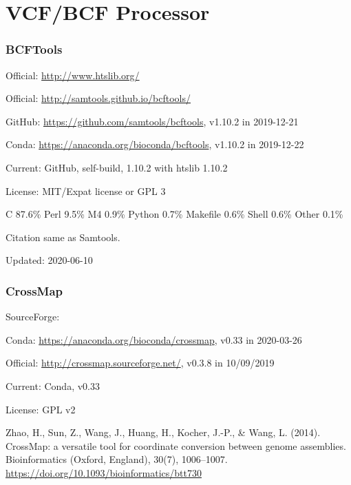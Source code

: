 \documentclass[]{article}
\begin{document}
\part{VCF/BCF Processor}

\section{BCFTools}

Official: \url{http://www.htslib.org/}

Official: \url{http://samtools.github.io/bcftools/}

GitHub: \url{https://github.com/samtools/bcftools}, v1.10.2 in 2019-12-21

Conda: \url{https://anaconda.org/bioconda/bcftools}, v1.10.2 in 2019-12-22

Current: GitHub, self-build, 1.10.2 with htslib 1.10.2

License: MIT/Expat license or GPL 3

C 87.6\% Perl 9.5\% M4 0.9\% Python 0.7\% Makefile 0.6\% Shell 0.6\% Other 0.1\%

Citation same as Samtools.

Updated: 2020-06-10

\section{CrossMap}

SourceForge: 

Conda: \url{https://anaconda.org/bioconda/crossmap}, v0.33 in 2020-03-26

Official: \url{http://crossmap.sourceforge.net/}, v0.3.8 in 10/09/2019

Current: Conda, v0.33

License: GPL v2

Zhao, H., Sun, Z., Wang, J., Huang, H., Kocher, J.-P., \& Wang, L. (2014). CrossMap: a versatile tool for coordinate conversion between genome assemblies. Bioinformatics (Oxford, England), 30(7), 1006–1007. \url{https://doi.org/10.1093/bioinformatics/btt730}
\end{document}
